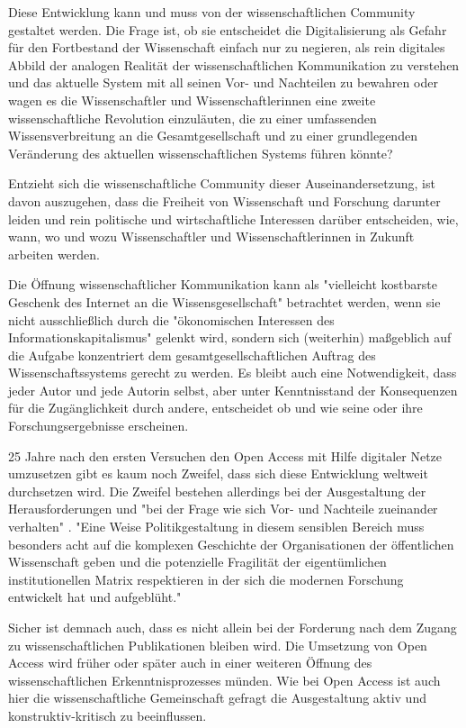 Diese Entwicklung kann und muss von der wissenschaftlichen Community gestaltet werden. Die Frage ist, ob sie entscheidet die Digitalisierung als Gefahr für den Fortbestand der Wissenschaft einfach nur zu negieren, als rein digitales Abbild der analogen Realität der wissenschaftlichen Kommunikation zu verstehen und das aktuelle System mit all seinen Vor- und Nachteilen zu bewahren oder wagen es die Wissenschaftler und Wissenschaftlerinnen eine zweite wissenschaftliche Revolution einzuläuten, die zu einer umfassenden Wissensverbreitung an die Gesamtgesellschaft und zu einer grundlegenden Veränderung des aktuellen wissenschaftlichen Systems führen könnte?

Entzieht sich die wissenschaftliche Community dieser Auseinandersetzung, ist davon auszugehen, dass die Freiheit von Wissenschaft und Forschung darunter leiden und rein politische und wirtschaftliche Interessen darüber entscheiden, wie, wann, wo und wozu Wissenschaftler und Wissenschaftlerinnen in Zukunft arbeiten werden.

Die Öffnung wissenschaftlicher Kommunikation kann als "vielleicht kostbarste Geschenk des Internet an die Wissensgesellschaft" betrachtet werden, wenn sie nicht ausschließlich durch die "ökonomischen Interessen des Informationskapitalismus" \cite{hagner_2015_sache_buches} gelenkt wird, sondern sich (weiterhin) maßgeblich auf die Aufgabe konzentriert dem gesamtgesellschaftlichen Auftrag des Wissenschaftssystems gerecht zu werden. Es bleibt auch eine Notwendigkeit, dass jeder Autor und jede Autorin selbst, aber unter Kenntnisstand der Konsequenzen für die Zugänglichkeit durch andere, entscheidet ob und wie seine oder ihre Forschungsergebnisse erscheinen.

25 Jahre nach den ersten Versuchen den Open Access mit Hilfe digitaler Netze umzusetzen gibt es kaum noch Zweifel, dass sich diese Entwicklung weltweit durchsetzen wird. Die Zweifel bestehen allerdings bei der Ausgestaltung der Herausforderungen und "bei der Frage wie sich Vor- und Nachteile zueinander verhalten" \cite{hagner_2015_sache_buches}. "Eine Weise Politikgestaltung in diesem sensiblen Bereich  muss besonders acht auf die komplexen Geschichte der Organisationen der öffentlichen Wissenschaft geben und die potenzielle Fragilität der eigentümlichen institutionellen Matrix respektieren in der sich die modernen Forschung entwickelt hat und aufgeblüht."\cite{david1998_common}

Sicher ist demnach auch, dass es nicht allein bei der Forderung nach dem Zugang zu wissenschaftlichen Publikationen bleiben wird. Die Umsetzung von Open Access wird früher oder später auch in einer weiteren Öffnung des wissenschaftlichen Erkenntnisprozesses münden. Wie bei Open Access ist auch hier die wissenschaftliche Gemeinschaft gefragt die Ausgestaltung aktiv und konstruktiv-kritisch zu beeinflussen.

